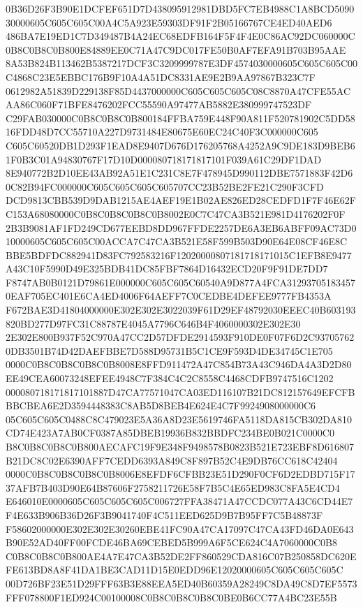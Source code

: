 \documentclass[UTF8,fontset=fandol,zihao=-4,a4paper]{ctexart}
\begin{document}
{{0B36D26F3B90E1DCFEF651D7D438095912981DBD5FC7EB4988C1A8BCD509030000605C605C605C00A4C5A923E59303DF91F2B05166767CE4ED40AED6
486BA7E19ED1C7D349487B4A24EC68EDFB164F5F4F4E0C86AC92DC060000C0B8C0B8C0B800E84889EE0C71A47C9DC017FE50B0AF7EFA91B703B95AAE
8A53B824B113462B5387217DCF3C3209999787E3DF4574030000605C605C605C00C4868C23E5EBBC176B9F10A4A51DC8331AE9E2B9AA97867B323C7F
0612982A51839D229138F85D4437000000C605C605C605C08C8870A47CFE55ACAA86C060F71BFE8476202FCC55590A97477AB5882E380999747523DF
C29FAB030000C0B8C0B8C0B800184FFBA759E448F90A811F520781902C5DD5816FDD48D7CC55710A227D9731484E80675E60EC24C40F3C000000C605
C605C60520DB1D293F1EAD8E9407D676D176205768A4252A9C9DE183D9BEB61F0B3C01A94830767F17D10D000080718171817101F039A61C29DF1DAD
8E940772B2D10EE43AB92A51E1C231C8E7F478945D990112DBE7571883F42D60C82B94FC000000C605C605C605C605707CC23B52BE2FE21C290F3CFD
DCD9813CBB539D9DAB1215AE4AEF19E1B02AE826ED28CEDFD1F7F46E62FC153A68080000C0B8C0B8C0B8C0B8002E0C7C47CA3B521E981D4176202F0F
2B3B9081AF1FD249CD677EEBD8DD967FFDE2257DE6A3EB6ABFF09AC73D010000605C605C605C00ACCA7C47CA3B521E58F599B503D90E64E08CF46E8C
BBE5BDFDC882941D83FC792583216F12020000807181718171015C1EFB8E9477A43C10F5990D49E325BDB41DC85FBF7864D16432ECD20F9F91DE7DD7
F8747AB0B0121D79861E000000C605C605C60540A9D877A4FCA312937051834570EAF705EC401E6CA4ED4006F64AEFF7C0CEDBE4DEFEE9777FB4353A
F672BAE3D41804000000E302E302E3022039F61D29EF48792030EEEC40B603193820BD277D97FC31C88787E4045A7796C646B4F4060000302E302E30
2E302E800B937F52C970A47CC2D57DFDE2914593F910DE0F07F6D2C937057620DB3501B74D42DAEFBBE7D588D95731B5C1CE9F593D4DE34745C1E705
0000C0B8C0B8C0B8C0B8008E8FFD911472A47C854B73A43C946DA4A3D2D80EE49CEA60073248EFEE4948C7F384C4C2C8558C4468CDFB9747516C1202
000080718171817101887D47CA77571047CA03ED116107B21DC812157649EFCFBBBCBEA6E2D3594448383C8AB5D8BEB4E624E4C7F9924908000000C6
05C605C605C0488C8C479023E5A36A8D23E5619746FA5118DA815CB302DA810CD74E423A7AB0CF0387A85DBEB19936B832BBDFC234BE0B021C0000C0
B8C0B8C0B8C0B800AECAFC19F9E348F9498578B0823B521E723EBF8D616807B21DC8C02E6390AFF7CEDD6393A849C8F897B52C4E9DB76CC618C42404
0000C0B8C0B8C0B8C0B8006E8EFDF6CFBB23E51D290F0CF6D2EDBD715F1737AFB7B403D90E64B87606F2758211726E58F7B5C4E65ED983C8FA5E4CD4
E646010E0000605C605C605C605C006727FFA38471A47CCDC077A43C6CD44E7F4E633B906B36D26F3B9041740F4C511EED625D9B7B95FF7C5B48873F
F58602000000E302E302E30260EBE41FC90A47CA17097C47CA43FD46DA0E643B90E52AD40FF00FCDE46BA69CEBED5B999A6F5CE624C4A7060000C0B8
C0B8C0B8C0B800AE4A7E47CA3B52DE2FF860529CDA816C07B250858DC620EFE613BD8A8F41DA1BE3CAD11D15E0EDD96E12020000605C605C605C605C
00D726BF23E51D29FFF63B3E88EEA5ED40B60359A28249C8DA49C8D7EF5573FFF078800F1ED924C00100008C0B8C0B8C0B8C0BE0B6CC77A4BC23E55B
}}
\end{document}
